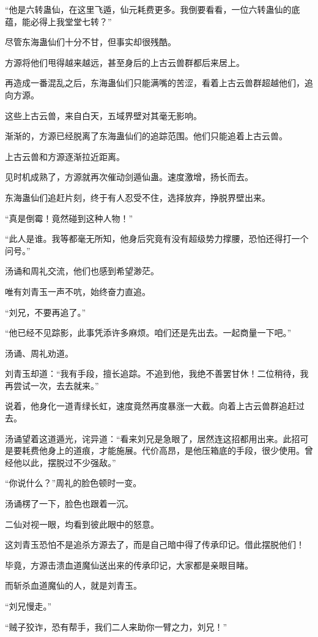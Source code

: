 \begin{this_body}
“他是六转蛊仙，在这里飞遁，仙元耗费更多。我倒要看看，一位六转蛊仙的底蕴，能必得上我堂堂七转？”

尽管东海蛊仙们十分不甘，但事实却很残酷。

方源将他们甩得越来越远，甚至身后的上古云兽群都后来居上。

再造成一番混乱之后，东海蛊仙们只能满嘴的苦涩，看着上古云兽群超越他们，追向方源。

这些上古云兽，来自白天，五域界壁对其毫无影响。

渐渐的，方源已经脱离了东海蛊仙们的追踪范围。他们只能追着上古云兽。

上古云兽和方源逐渐拉近距离。

见时机成熟了，方源就再次催动剑遁仙蛊。速度激增，扬长而去。

东海蛊仙们追赶片刻，终于有人忍受不住，选择放弃，挣脱界壁出来。

“真是倒霉！竟然碰到这种人物！”

“此人是谁。我等都毫无所知，他身后究竟有没有超级势力撑腰，恐怕还得打一个问号。”

汤诵和周礼交流，他们也感到希望渺茫。

唯有刘青玉一声不吭，始终奋力直追。

“刘兄，不要再追了。”

“他已经不见踪影，此事凭添许多麻烦。咱们还是先出去。一起商量一下吧。”

汤诵、周礼劝道。

刘青玉却道：“我有手段，擅长追踪。不追到他，我绝不善罢甘休！二位稍待，我再尝试一次，去去就来。”

说着，他身化一道青绿长虹，速度竟然再度暴涨一大截。向着上古云兽群追赶过去。

汤诵望着这道遁光，诧异道：“看来刘兄是急眼了，居然连这招都用出来。此招可是要耗费他身上的道痕，才能施展。代价高昂，是他压箱底的手段，很少使用。曾经他以此，摆脱过不少强敌。”

“你说什么？”周礼的脸色顿时一变。

汤诵楞了一下，脸色也跟着一沉。

二仙对视一眼，均看到彼此眼中的怒意。

这刘青玉恐怕不是追杀方源去了，而是自己暗中得了传承印记。借此摆脱他们！

毕竟，方源击溃血道魔仙送出来的传承印记，大家都是亲眼目睹。

而斩杀血道魔仙的人，就是刘青玉。

“刘兄慢走。”

“贼子狡诈，恐有帮手，我们二人来助你一臂之力，刘兄！”


\end{this_body}
